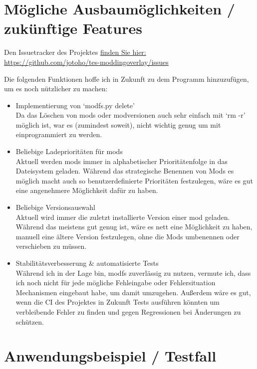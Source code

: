 \documentclass[a4paper,numbers=withenddot,11pt]{scrartcl}
\begin{document}
\section{Mögliche Ausbaumöglichkeiten / zukünftige Features}

Den Issuetracker des Projektes \href{https://github.com/jotoho/tes-moddingoverlay/issues}{finden Sie hier:\\https://github.com/jotoho/tes-moddingoverlay/issues}

Die folgenden Funktionen hoffe ich in Zukunft zu dem Programm hinzuzufügen,
um es noch nützlicher zu machen:

\begin{itemize}
  \item Implementierung von `modfs.py delete'\\
        Da das Löschen von mods oder modversionen auch sehr einfach mit `rm -r' möglich ist,
        war es (zumindest soweit), nicht wichtig genug um mit einprogrammiert zu werden.
  \item Beliebige Ladeprioritäten für mods\\
        Aktuell werden mods immer in alphabetischer Prioritätenfolge in das
        Dateisystem geladen.
        Während das strategische Benennen von Mods es möglich macht auch so
        benutzerdefinierte Prioritäten festzulegen, wäre es gut eine angenehmere
        Möglichkeit dafür zu haben.
  \item Beliebige Versionsauswahl\\
        Aktuell wird immer die zuletzt installierte Version einer mod geladen.
        Während das meistens gut genug ist, wäre es nett eine Möglichkeit zu haben,
        manuell eine ältere Version festzulegen, ohne die Mods umbenennen oder
        verschieben zu müssen.
  \item Stabilitätsverbesserung \& automatisierte Tests\\
        Während ich in der Lage bin, modfs zuverlässig zu nutzen,
        vermute ich, dass ich noch nicht für jede mögliche Fehleingabe oder
        Fehlersituation Mechanismen eingebaut habe, um damit umzugehen.
        Außerdem wäre es gut, wenn die CI des Projektes in Zukunft Tests ausführen
        könnten um verbleibende Fehler zu finden und gegen Regressionen bei
        Änderungen zu schützen.
\end{itemize}

\section{Anwendungsbeispiel / Testfall}
\end{document}
